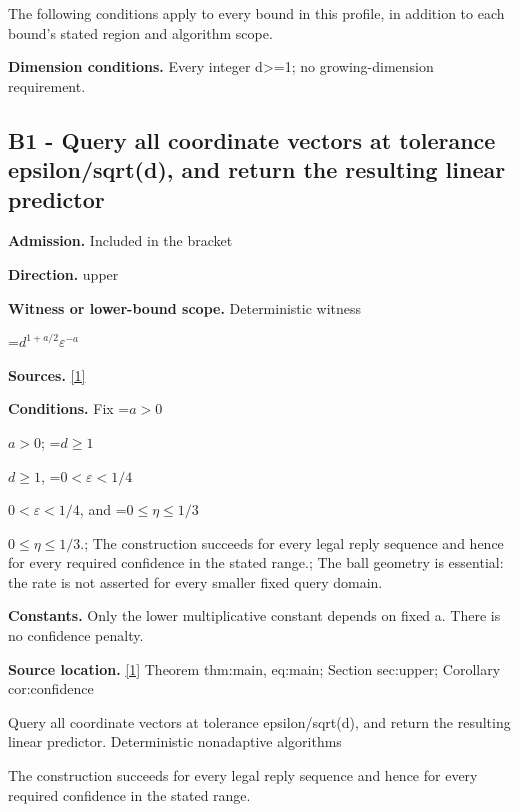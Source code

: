\documentclass[10pt,a4paper]{article}
\newcommand{\AtlasMath}[1]{\par\begingroup\centering\setbox0=\hbox{$\displaystyle #1$}\ifdim\wd0>1.4\linewidth\typeout{ATLAS WIDE FORMULA: \the\wd0}\fi\ifdim\wd0>\linewidth\resizebox{\linewidth}{!}{\box0}\else\box0\fi\par\endgroup}
\newcommand{\AtlasInlineMath}[1]{\begingroup\setbox0=\hbox{$#1$}\ifdim\wd0>.4\linewidth\endgroup\AtlasMath{#1}\else\endgroup$#1$\fi}
\begin{document}
The following conditions apply to every bound in this profile, in addition to each bound's stated region and algorithm scope.



\textbf{Dimension conditions.} Every integer d>=1; no growing-dimension requirement.



\subsection{B1 - Query all coordinate vectors at tolerance epsilon/sqrt(d), and return the resulting linear predictor}


\textbf{Admission.} Included in the bracket



\textbf{Direction.} upper



\textbf{Witness or lower-bound scope.} Deterministic witness



\AtlasMath{d^{1+a/2}\varepsilon^{-a}}


\textbf{Sources.} \href{https://github.com/WU-Wendao/Colombo/blob/main/colombo_sensorium/Complexity_altas/data/sources/colombo/H18/manuscript.pdf}{[1]}



\textbf{Conditions.} Fix \AtlasInlineMath{a>0}; \AtlasInlineMath{d\ge1}, \AtlasInlineMath{0<\varepsilon<1/4}, and \AtlasInlineMath{0\le\eta\le1/3}.; The construction succeeds for every legal reply sequence and hence for every required confidence in the stated range.; The ball geometry is essential: the rate is not asserted for every smaller fixed query domain.



\textbf{Constants.} Only the lower multiplicative constant depends on fixed a. There is no confidence penalty.



\textbf{Source location.} \href{https://github.com/WU-Wendao/Colombo/blob/main/colombo_sensorium/Complexity_altas/data/sources/colombo/H18/manuscript.pdf}{[1]} Theorem thm:main, eq:main; Section sec:upper; Corollary cor:confidence



Query all coordinate vectors at tolerance epsilon/sqrt(d), and return the resulting linear predictor. Deterministic nonadaptive algorithms



The construction succeeds for every legal reply sequence and hence for every required confidence in the stated range.
\end{document}
